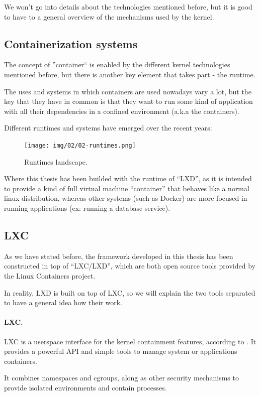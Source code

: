 We won't go into details about the technologies mentioned before, but it is good to have to a general overview of the mechanisms used by the kernel.


\bigskip
\subsection{Containerization systems}
The concept of ''container`` is enabled by the different kernel technologies mentioned before, but there is another key element that takes part - the runtime.

The uses and systems in which containers are used nowadays vary a lot, but the key that they have in common is that they want to run some kind of application with all their dependencies in a confined environment (a.k.a the containers).

Different runtimes and systems have emerged over the recent years:
\begin{figure}[H]
	\label{fig:Runtimes containers landscape}
	\centering
	\texttt{[image: img/02/02-runtimes.png]}
	\caption[Runtimes landscape]{\footnotesize{Runtimes landscape.}}
\end{figure}

Where this thesis has been builded with the runtime of ``LXD'', as it is intended to provide a kind of full virtual machine ``container'' that behaves like a normal linux distribution, whereas other systems (such as Docker) are more focused in running applications (ex: running a database service).

\subsection{LXC}
As we have stated before, the framework developed in this thesis has been constructed in top of ``LXC/LXD'', which are both open source tools provided by the Linux Containers project.

In reality, LXD is built on top of LXC, so we will explain the two tools separated to have a general idea how their work.

\paragraph{LXC.} LXC is a userspace interface for the kernel containment features, according to \cite{lxc}. It provides a powerful API and simple tools to manage system or applications containers.

It combines namespaces and cgroups, along as other security mechanisms to provide isolated environments and contain processes.

